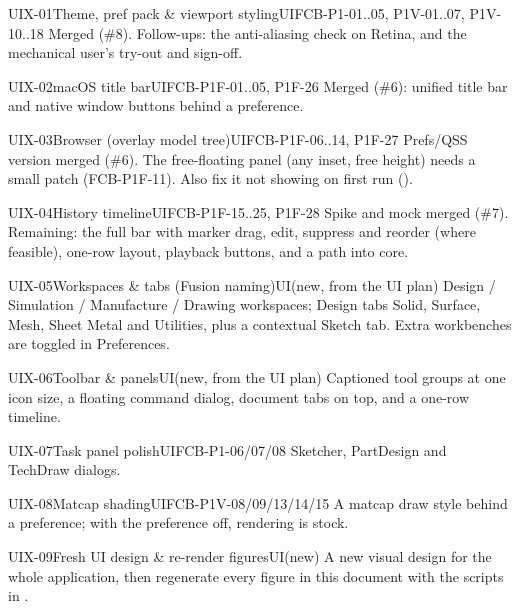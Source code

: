 \begin{epic}{UIX-01}{Theme, pref pack \& viewport styling}{UI}{\stDone}{FCB-P1-01..05, P1V-01..07, P1V-10..18}
Merged (\#8). Follow-ups: the anti-aliasing check on Retina, and the mechanical user's try-out and sign-off.
\end{epic}
\begin{epic}{UIX-02}{macOS title bar}{UI}{\stDone}{FCB-P1F-01..05, P1F-26}
Merged (\#6): unified title bar and native window buttons behind a preference.
\end{epic}
\begin{epic}{UIX-03}{Browser (overlay model tree)}{UI}{\stProg}{FCB-P1F-06..14, P1F-27}
Prefs/QSS version merged (\#6). The free-floating panel (any inset, free height) needs a small
 patch (FCB-P1F-11). Also fix it not showing on first run ().
\end{epic}
\begin{epic}{UIX-04}{History timeline}{UI}{\stProg}{FCB-P1F-15..25, P1F-28}
Spike and mock merged (\#7). Remaining: the full bar with marker drag, edit, suppress and reorder (where
feasible), one-row layout, playback buttons, and a path into core.
\end{epic}
\begin{epic}{UIX-05}{Workspaces \& tabs (Fusion naming)}{UI}{\stTodo}{(new, from the UI plan)}
Design / Simulation / Manufacture / Drawing workspaces; Design tabs Solid, Surface, Mesh, Sheet Metal and
Utilities, plus a contextual Sketch tab. Extra workbenches are toggled in Preferences.
\end{epic}
\begin{epic}{UIX-06}{Toolbar \& panels}{UI}{\stTodo}{(new, from the UI plan)}
Captioned tool groups at one icon size, a floating command dialog, document tabs on top, and a one-row timeline.
\end{epic}
\begin{epic}{UIX-07}{Task panel polish}{UI}{\stTodo}{FCB-P1-06/07/08}
Sketcher, PartDesign and TechDraw dialogs.
\end{epic}
\begin{epic}{UIX-08}{Matcap shading}{UI}{\stTodo}{FCB-P1V-08/09/13/14/15}
A matcap draw style behind a preference; with the preference off, rendering is stock.
\end{epic}
\begin{epic}{UIX-09}{Fresh UI design \& re-render figures}{UI}{\stTodo}{(new)}
A new visual design for the whole application, then regenerate every figure in this document with the scripts
in .
\end{epic}

